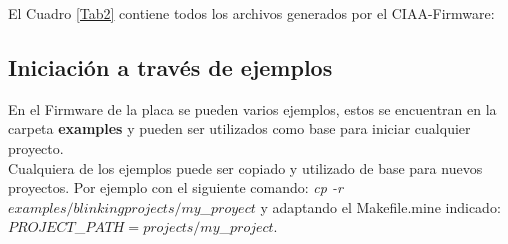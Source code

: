 \documentclass[12pt,letterpaper]{article}
\begin{document}
{El Cuadro \ref{Tab2} contiene todos los archivos generados por el CIAA-Firmware:
\begin{table}
\begin{center}
\caption{Utilidades,archivos,y drivers para la placa}
\label{Tab1}
\end{center}
\end{table}


\begin{table}[h]
\begin{center}
\caption{Descripción de archivos generados en un proyecto en RTOS.}
\label{Tab2}
\end{center}
\end{table}

}
\subsection{Iniciación a través de ejemplos}
En el Firmware de la placa se pueden varios ejemplos, estos se encuentran en la carpeta \textbf{examples} y pueden ser utilizados como base para iniciar cualquier proyecto.
 \\
 
Cualquiera de los ejemplos puede ser copiado y utilizado de base para nuevos proyectos. Por ejemplo con el siguiente comando:	\textit{cp -r $examples/blinking projects/my$\_$proyect$} y adaptando el Makefile.mine indicado: $PROJECT$\_$PATH = projects/my$\_$project$.
\end{document}
